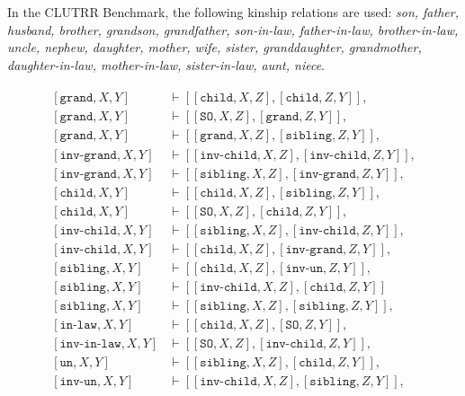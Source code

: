 \documentclass[letterpaper, 12pt]{report}
\begin{document}
In the CLUTRR Benchmark, the following kinship relations are used: \textit{son, father, husband, brother, grandson, grandfather, son-in-law, father-in-law, brother-in-law, uncle, nephew, daughter, mother, wife, sister, granddaughter, grandmother, daughter-in-law, mother-in-law, sister-in-law, aunt, niece}.

\footnotesize
\begin{align*}
\begin{split}
    [\texttt{grand}, X,Y] &\vdash [[\texttt{child}, X,Z],[\texttt{child}, Z,Y]], \\
    [\texttt{grand}, X,Y] &\vdash [[\texttt{SO}, X,Z],[\texttt{grand}, Z,Y]], \\
    [\texttt{grand}, X,Y] &\vdash [[\texttt{grand}, X,Z], [\texttt{sibling}, Z,Y]], \\
    [\texttt{inv-grand}, X,Y] &\vdash [[\texttt{inv-child}, X,Z], [\texttt{inv-child}, Z,Y]], \\
    [\texttt{inv-grand}, X,Y] &\vdash [[\texttt{sibling}, X,Z], [\texttt{inv-grand}, Z,Y]], \\
    [\texttt{child}, X,Y] &\vdash [[\texttt{child}, X,Z], [\texttt{sibling}, Z,Y]], \\
  [\texttt{child}, X,Y] &\vdash [[\texttt{SO}, X,Z], [\texttt{child}, Z,Y]], \\
  [\texttt{inv-child}, X,Y] &\vdash [[\texttt{sibling}, X,Z], [\texttt{inv-child}, Z,Y]], \\
    [\texttt{inv-child}, X,Y] &\vdash [[\texttt{child}, X,Z], [\texttt{inv-grand}, Z,Y]], \\
    [\texttt{sibling}, X,Y] &\vdash [[\texttt{child}, X,Z], [\texttt{inv-un}, Z,Y]], \\
    [\texttt{sibling}, X,Y] &\vdash [[\texttt{inv-child}, X,Z], [\texttt{child}, Z,Y]] \\
    [\texttt{sibling}, X,Y] &\vdash [[\texttt{sibling}, X,Z],[\texttt{sibling}, Z,Y]], \\
    [\texttt{in-law}, X,Y] &\vdash [[\texttt{child}, X,Z],[\texttt{SO}, Z,Y]], \\
    [\texttt{inv-in-law}, X,Y] &\vdash [[\texttt{SO}, X,Z],[\texttt{inv-child}, Z,Y]], \\
    [\texttt{un}, X,Y] &\vdash [[\texttt{sibling}, X,Z],[\texttt{child}, Z,Y]], \\
    [\texttt{inv-un}, X,Y] &\vdash [[\texttt{inv-child}, X,Z],[\texttt{sibling}, Z,Y]], \\
\end{split}
\end{align*}
\normalsize
\end{document}

